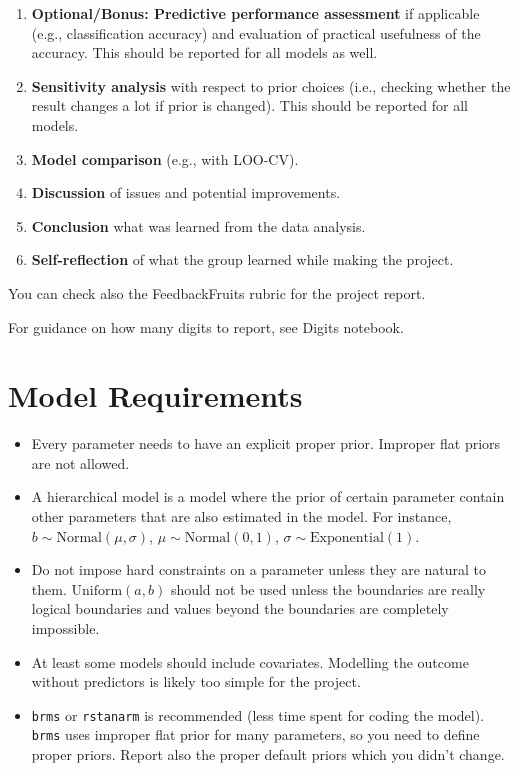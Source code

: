 \documentclass[11pt,a4paper]{article}
\begin{document}
\begin{enumerate}
    \item \textbf{Optional/Bonus: Predictive performance assessment} if applicable (e.g., classification accuracy) and evaluation of practical usefulness of the accuracy. This should be reported for all models as well.
    
    \item \textbf{Sensitivity analysis} with respect to prior choices (i.e., checking whether the result changes a lot if prior is changed). This should be reported for all models.
    
    \item \textbf{Model comparison} (e.g., with LOO-CV).
    
    \item \textbf{Discussion} of issues and potential improvements.
    
    \item \textbf{Conclusion} what was learned from the data analysis.
    
    \item \textbf{Self-reflection} of what the group learned while making the project.
\end{enumerate}

You can check also the FeedbackFruits rubric for the project report.

For guidance on how many digits to report, see Digits notebook.

\section{Model Requirements}

\begin{itemize}
    \item Every parameter needs to have an explicit proper prior. Improper flat priors are not allowed.
    \item A hierarchical model is a model where the prior of certain parameter contain other parameters that are also estimated in the model. For instance, $b \sim \text{Normal}(\mu, \sigma)$, $\mu \sim \text{Normal}(0, 1)$, $\sigma \sim \text{Exponential}(1)$.
    \item Do not impose hard constraints on a parameter unless they are natural to them. $\text{Uniform}(a, b)$ should not be used unless the boundaries are really logical boundaries and values beyond the boundaries are completely impossible.
    \item At least some models should include covariates. Modelling the outcome without predictors is likely too simple for the project.
    \item \texttt{brms} or \texttt{rstanarm} is recommended (less time spent for coding the model). \texttt{brms} uses improper flat prior for many parameters, so you need to define proper priors. Report also the proper default priors which you didn't change.
\end{itemize}
\end{document}

